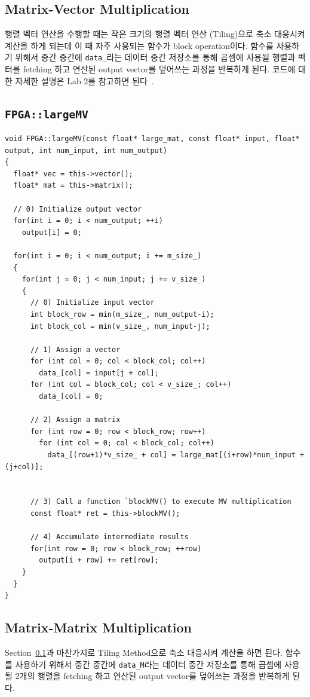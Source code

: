\documentclass{article}
\begin{document}
\subsection{Matrix-Vector Multiplication}
\label{sec:mv}
행렬 벡터 연산을 수행할 때는 작은 크기의 행렬 벡터 연산 (Tiling)으로 축소 대응시켜 계산을 하게 되는데 이 때 자주 사용되는 함수가 block operation이다. 함수를 사용하기 위해서 중간 중간에 \texttt{data\_}라는 데이터 중간 저장소를 통해 곱셈에 사용될 행렬과 벡터를 fetching 하고 연산된 output vector를 덮어쓰는 과정을 반복하게 된다. 코드에 대한 자세한 설명은 Lab 2를 참고하면 된다~\cite{lab2}.

\subsection*{\texttt{FPGA::largeMV}}
\begin{lstlisting}[style={c-style}]
void FPGA::largeMV(const float* large_mat, const float* input, float* output, int num_input, int num_output)
{
  float* vec = this->vector();
  float* mat = this->matrix();

  // 0) Initialize output vector		
  for(int i = 0; i < num_output; ++i)
    output[i] = 0;

  for(int i = 0; i < num_output; i += m_size_)
  {
    for(int j = 0; j < num_input; j += v_size_)
    {			
      // 0) Initialize input vector
      int block_row = min(m_size_, num_output-i);
      int block_col = min(v_size_, num_input-j);
            
      // 1) Assign a vector
      for (int col = 0; col < block_col; col++)
        data_[col] = input[j + col];
      for (int col = block_col; col < v_size_; col++)
        data_[col] = 0;

      // 2) Assign a matrix
      for (int row = 0; row < block_row; row++)
        for (int col = 0; col < block_col; col++)
          data_[(row+1)*v_size_ + col] = large_mat[(i+row)*num_input + (j+col)];


      // 3) Call a function `blockMV() to execute MV multiplication
      const float* ret = this->blockMV();

      // 4) Accumulate intermediate results
      for(int row = 0; row < block_row; ++row)
        output[i + row] += ret[row];
    } 
  }
}
\end{lstlisting}

\subsection{Matrix-Matrix Multiplication}
Section~\ref{sec:mv}과 마찬가지로 Tiling Method으로 축소 대응시켜 계산을 하면 된다. 함수를 사용하기 위해서 중간 중간에 \texttt{data\_M}라는 데이터 중간 저장소를 통해 곱셈에 사용될 2개의 행렬을 fetching 하고 연산된 output vector를 덮어쓰는 과정을 반복하게 된다. 
\end{document}
